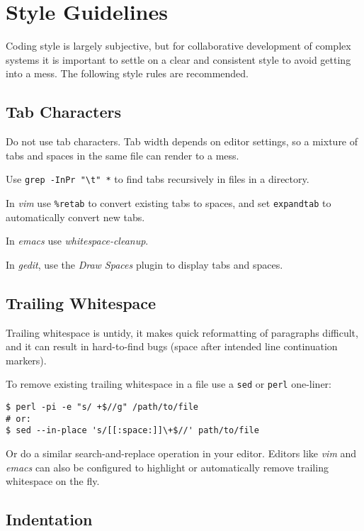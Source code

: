 \section{Style Guidelines}

Coding style is largely subjective, but for collaborative development of
complex systems it is important to settle on a clear and consistent style to
avoid getting into a mess. The following style rules are recommended.

\subsection{Tab Characters}

Do not use tab characters. Tab width depends on editor settings, so a mixture
of tabs and spaces in the same file can render to a mess.

Use \lstinline=grep -InPr "\t" *= to find tabs recursively in files in
a directory.

In {\em vim} use \lstinline=%retab= to convert existing tabs to spaces,
and set \lstinline=expandtab= to automatically convert new tabs.

In {\em emacs} use {\em whitespace-cleanup}.

In {\em gedit}, use the {\em Draw Spaces} plugin to display tabs and spaces.

\subsection{Trailing Whitespace}

Trailing whitespace is untidy, it makes quick reformatting of paragraphs
difficult, and it can result in hard-to-find bugs (space after intended
line continuation markers).

To remove existing trailing whitespace in a file use a \lstinline=sed= or
\lstinline=perl= one-liner:

\lstset{language=sh}
\begin{lstlisting}
$ perl -pi -e "s/ +$//g" /path/to/file
# or:
$ sed --in-place 's/[[:space:]]\+$//' path/to/file
\end{lstlisting}

Or do a similar search-and-replace operation in your editor. Editors like {\em
vim} and {\em emacs} can also be configured to highlight or automatically
remove trailing whitespace on the fly.

\subsection{Indentation}

